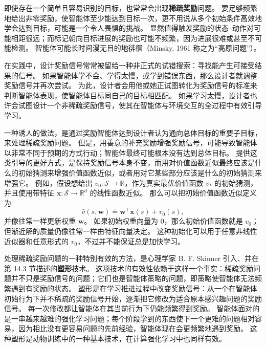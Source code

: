 \documentclass[UTF8, 12pt, fontset=fandol, oneside]{ctexart}
\begin{document}
即使存在一个简单且容易识别的目标，也常常会出现\textbf{稀疏奖励}问题。
要足够频繁地给出非零奖励，使智能体至少能达到目标一次，更不用说从多个初始条件高效地学会达到目标，可能是一个令人畏惧的挑战。
显然值得触发奖励的状态--动作对可能相距很远；而标记朝向目标进展的奖励也可能不频繁，因为进展很难或甚至不可能检测。
智能体可能长时间漫无目的地徘徊（Minsky, 1961 称之为“高原问题”）。

在实践中，设计奖励信号常常被留给一种非正式的试错搜索：寻找能产生可接受结果的信号。
如果智能体学不会、学得太慢，或学到错误东西，那么设计者就调整奖励信号并再次尝试。
为此，设计者会用他或她正试图转化为奖励信号的标准来判断智能体表现，使智能体目标同自己的目标相匹配。
如果学习太慢，设计者也许会试图设计一个非稀疏奖励信号，使其在智能体与环境交互的全过程中有效引导学习。

一种诱人的做法，是通过奖励智能体达到设计者认为通向总体目标的重要子目标，来处理稀疏奖励问题。
但是，用善意的补充奖励增强奖励信号，可能导致智能体以非常不同于预期的方式行动；智能体最终可能根本没有达到总体目标。
提供这类引导的更好方式，是保持奖励信号本身不变，而用对价值函数近似最终应该是什么的初始猜测来增强价值函数近似，或者用对它某些部分应该是什么的初始猜测来增强它。
例如，假设想给出 $v_0:\mathcal{S}\to\mathbb{R}$，作为真实最优价值函数 $v_*$ 的初始猜测，并且使用带特征 $\mathbf{x}:\mathcal{S}\to\mathbb{R}^d$ 的线性函数近似。
那么可以把初始价值函数近似定义为
\begin{equation}
\hat v(s,\mathbf{w})\doteq \mathbf{w}^\top\mathbf{x}(s)+v_0(s),
\tag{17.10}
\end{equation}
并像往常一样更新权重 $\mathbf{w}$。
如果初始权重向量为 $0$，那么初始价值函数就是 $v_0$；但渐近解的质量仍像往常一样由特征向量决定。
这种初始化可以用于任意非线性近似器和任意形式的 $v_0$，不过并不能保证总是加快学习。

处理稀疏奖励问题的一种特别有效的方法，是心理学家 B. F. Skinner 引入、并在第 14.3 节描述的\textbf{塑形}技术。
这项技术的有效性依赖于这样一个事实：稀疏奖励问题并不只是奖励信号的问题；它们也是智能体策略的问题，即策略使智能体无法频繁遇到有奖励的状态。
塑形是在学习推进过程中改变奖励信号：从一个在智能体初始行为下并不稀疏的奖励信号开始，逐渐把它修改为适合原本感兴趣问题的奖励信号。
每一次修改都让智能体在其当前行为下仍能频繁得到奖励。
智能体面对的是一串越来越难的强化学习问题；每个阶段学到的东西使下一个更难的问题相对容易，因为相比没有更容易问题的先前经验，智能体现在会更频繁地遇到奖励。
这种塑形是动物训练中的一种基本技术，在计算强化学习中也同样有效。
\end{document}
